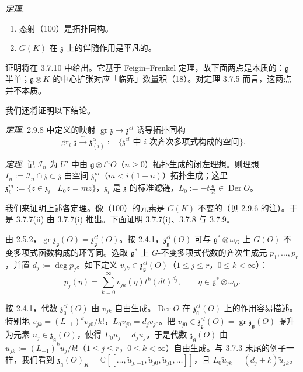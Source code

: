  \emph{定理.}
\begin{enumerate}[label=(\roman*),leftmargin=2.2em]
\item 态射（100）是拓扑同构。
\item $G(K)$ 在 $\mathfrak{z}$ 上的伴随作用是平凡的。
\end{enumerate}
证明将在 3.7.10 中给出。它基于 Feigin--Frenkel 定理，故下面两点是本质的：$\mathfrak{g}$ 半单；$\mathfrak{g}\otimes K$ 的中心扩张对应「临界」数量积（18）。对定理 3.7.5 而言，这两点并不本质。

我们还将证明以下结论。

 \emph{定理.} 2.9.8 中定义的映射 $\operatorname{gr}\mathfrak{z}\to\mathfrak{z}^{cl}$ 诱导拓扑同构
\[
\operatorname{gr}_i\mathfrak{z}\xrightarrow{\ \sim\ }\mathfrak{z}^{cl}_{(i)}:=\{\mathfrak{z}^{cl}\text{ 中 }i\text{ 次齐次多项式构成的空间}\}.
\]


 \emph{定理.} 记 $\mathcal{I}_n$ 为 $\overline{U}'$ 中由 $\mathfrak{g}\otimes t^nO$（$n\ge 0$）拓扑生成的闭左理想。则理想 $I_n:=\mathcal{I}_n\cap\mathfrak{z}\subset\mathfrak{z}$ 由空间 $\mathfrak{z}^m_i$（$m<i(1-n)$）拓扑生成；这里 $\mathfrak{z}^m_i:=\{z\in\mathfrak{z}_i\mid L_0z=mz\}$，$\mathfrak{z}_i$ 是 $\mathfrak{z}$ 的标准滤链，$L_0:=-t\frac{d}{dt}\in\operatorname{Der}O$。

 我们来证明上述各定理。像（100）的元素是 $G(K)$-不变的（见 2.9.6 的注）。于是 3.7.7(ii) 由 3.7.7(i) 推出。下面证明 3.7.7(i)、3.7.8 与 3.7.9。

由 2.5.2，$\operatorname{gr}\mathfrak{z}_{\mathfrak{g}}(O)=\mathfrak{z}^{cl}_{\mathfrak{g}}(O)$。按 2.4.1，$\mathfrak{z}^{cl}_{\mathfrak{g}}(O)$ 可与 $\mathfrak{g}^*\otimes\omega_O$ 上 $G(O)$-不变多项式函数构成的环等同。选取 $\mathfrak{g}^*$ 上 $G$-不变多项式代数的齐次生成元 $p_1,\dots,p_r$，并置 $d_j:=\deg p_j$。如下定义 $v_{jk}\in\mathfrak{z}^{cl}_{\mathfrak{g}}(O)$（$1\le j\le r$，$0\le k<\infty$）：
\begin{equation}\tag{105}
p_j(\eta)=\sum_{k=0}^{\infty}v_{jk}(\eta)t^k(dt)^{d_j},\qquad \eta\in\mathfrak{g}^*\otimes\omega_O.
\end{equation}

按 2.4.1，代数 $\mathfrak{z}^{cl}_{\mathfrak{g}}(O)$ 由 $v_{jk}$ 自由生成。$\operatorname{Der}O$ 在 $\mathfrak{z}^{cl}_{\mathfrak{g}}(O)$ 上的作用容易描述。特别地 $v_{jk}=(L_{-1})^kv_{j0}/k!$，$L_0v_{j0}=d_jv_{j0}$。把 $v_{j0}\in\mathfrak{z}^{cl}_{\mathfrak{g}}(O)=\operatorname{gr}\mathfrak{z}_{\mathfrak{g}}(O)$ 提升为元素 $u_j\in\mathfrak{z}_{\mathfrak{g}}(O)$，使得 $L_0u_j=d_ju_j$。于是代数 $\mathfrak{z}_{\mathfrak{g}}(O)$ 由 $u_{jk}:=(L_{-1})^ku_j/k!$（$1\le j\le r$，$0\le k<\infty$）自由生成。与 3.7.3 末尾的例子一样，我们看到 $\mathfrak{z}_{\mathfrak{g}}(O)_K=\mathbb{C}[[\dots,\tilde{u}_{j,-1},\tilde{u}_{j0},\tilde{u}_{j1},\dots]]$，且 $L_0\tilde{u}_{jk}=(d_j+k)\tilde{u}_{jk}$。

